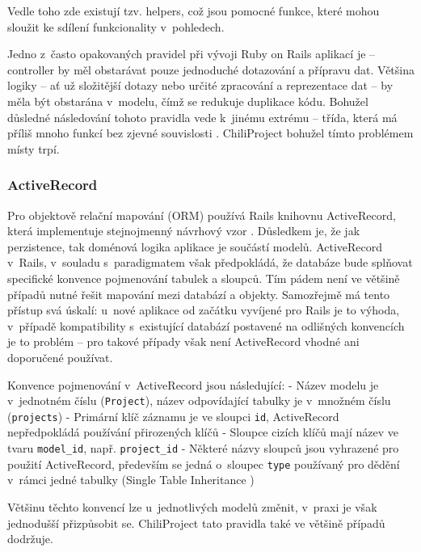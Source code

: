 \documentclass[thesis=B,czech]{FITthesis}[2012/05/02]
\begin{document}
Vedle toho zde existují tzv. helpers, což jsou pomocné funkce, které
mohou sloužit ke sdílení funkcionality v~pohledech.

Jedno z~často opakovaných pravidel při vývoji Ruby on Rails aplikací je
\citep{Buck2006} -- controller by měl
obstarávat pouze jednoduché dotazování a přípravu dat. Většina logiky --
ať už složitější dotazy nebo určité zpracování a reprezentace dat -- by
měla být obstarána v~modelu, čímž se redukuje duplikace kódu. Bohužel
důsledné následování tohoto pravidla vede k~jinému extrému -- třída,
která má příliš mnoho funkcí bez zjevné souvislosti \citep{Libbery2011}.
ChiliProject bohužel tímto problémem místy trpí.

\subsubsection{ActiveRecord}

Pro objektově relační mapování (ORM) používá Rails knihovnu
ActiveRecord, která implementuje stejnojmenný návrhový vzor \citep[str.
160]{Fowler2003}. Důsledkem je, že jak perzistence, tak doménová logika
aplikace je součástí modelů. ActiveRecord v~Rails, v~souladu
s~paradigmatem  však předpokládá, že
databáze bude splňovat specifické konvence pojmenování tabulek a
sloupců. Tím pádem není ve většině případů nutné řešit mapování mezi
databází a objekty. Samozřejmě má tento přístup svá úskalí: u~nové
aplikace od začátku vyvíjené pro Rails je to výhoda, v~případě
kompatibility s~existující databází postavené na odlišných konvencích je
to problém -- pro takové případy však není ActiveRecord vhodné ani
doporučené používat.

Konvence pojmenování v~ActiveRecord jsou následující: - Název modelu je
v~jednotném číslu (\lstinline!Project!), název odpovídající tabulky je
v~množném číslu (\lstinline!projects!) - Primární klíč záznamu je ve
sloupci \lstinline!id!, ActiveRecord nepředpokládá používání přirozených
klíčů - Sloupce cizích klíčů mají název ve tvaru \lstinline!model_id!,
např. \lstinline!project_id! - Některé názvy sloupců jsou vyhrazené pro
použití ActiveRecord, především se jedná o~sloupec \lstinline!type!
používaný pro dědění v~rámci jedné tabulky (Single Table Inheritance
\citep[str. 278]{Fowler2003})

Většinu těchto konvencí lze u~jednotlivých modelů změnit, v~praxi je
však jednodušší přizpůsobit se. ChiliProject tato pravidla také ve
většině případů dodržuje.
\end{document}
